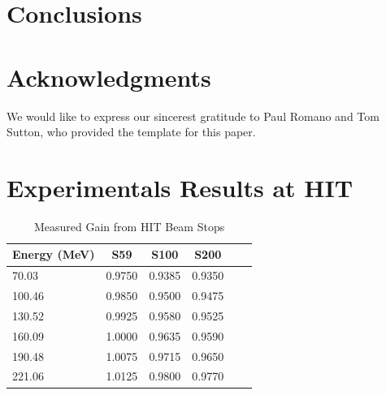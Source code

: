 \documentclass{mc2015}
\begin{document}
\section{Conclusions}


\section{Acknowledgments}

We would like to express our sincerest gratitude to Paul Romano and Tom Sutton, who provided the template for this paper.



\setlength{\baselineskip}{12pt}



\appendix
\section{Experimentals Results at HIT\cite{PTC-HIT}}

\begin{table}[H]
  \centering
  \caption{Measured Gain from HIT Beam Stops}
  \begin{tabular}{lccccc}
    \toprule
    Energy (MeV) & S59 & S100 & S200 \\
    \midrule
    70.03  & \num{0.9750} & \num{0.9385} & \num{0.9350} \\
    100.46 & \num{0.9850} & \num{0.9500} & \num{0.9475} \\
    130.52 & \num{0.9925} & \num{0.9580} & \num{0.9525} \\
    160.09 & \num{1.0000} & \num{0.9635} & \num{0.9590} \\
    190.48 & \num{1.0075} & \num{0.9715} & \num{0.9650} \\
    221.06 & \num{1.0125} & \num{0.9800} & \num{0.9770} \\
    \bottomrule
  \end{tabular}
  \label{tab:HIT_data}
\end{table}
\end{document}
